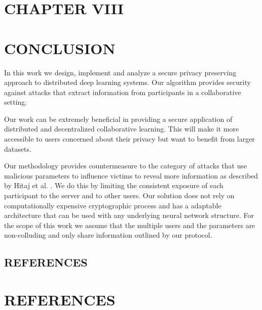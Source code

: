 \documentclass[letterpaper]{article}
\begin{document}
\begin{flushleft}
{\pagebreak
\section*{CHAPTER VIII}
\vspace{0.25in}
\section{CONCLUSION}

In this work we design, implement and analyze a secure privacy preserving approach to distributed deep learning systems.  Our
algorithm provides security against attacks that extract information from participants in a collaborative setting. 

Our work can be extremely beneficial in providing a secure application of distributed and decentralized collaborative learning. This
will make it more accessible to users concerned about their privacy but want to benefit from larger datasets.

Our methodology provides countermeasure to the category of attacks that use malicious parameters to influence victims to reveal more
information as described  by Hitaj  et al. \cite{hitaj2017deep} . We do this by limiting the consistent exposure of each participant to
the server and to other users. Our solution does not rely on computationally expensive cryptographic process and has a adaptable
architecture that can be used with any underlying neural network structure. For the scope of this work we assume that the multiple
users and the parameters are non-colluding and only share information outlined by our protocol. 

\newpage

\begin{center}
\vspace*{\fill}
\section*{\normalfont REFERENCES}
\vspace*{\fill}
\end{center}
\newpage
\section*{\normalfont REFERENCES} 




}

\end{flushleft}
\end{document}
